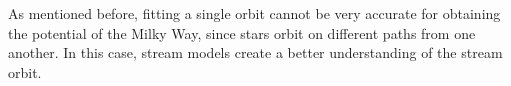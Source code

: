 \documentclass[preprint]{aastex}
\begin{document}
As mentioned before, fitting a single orbit cannot be very accurate for obtaining the potential of the Milky Way, since stars orbit on different paths from one another. In this case, stream models create a better understanding of the stream orbit.


\end{document}
